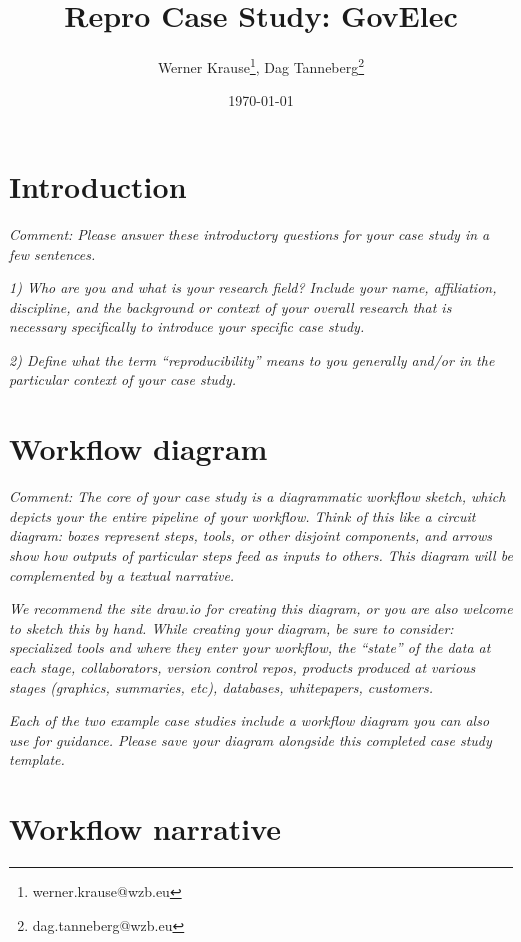 \documentclass[
  11pt
]{article}
\title{Repro Case Study: GovElec}
\author{Werner Krause\thanks{werner.krause@wzb.eu}, Dag Tanneberg\thanks{dag.tanneberg@wzb.eu}}
\date{\today}
\begin{document}
\maketitle

\thispagestyle{empty}

\clearpage
\setcounter{page}{1}
\onehalfspacing

\section{Introduction}
\textit{Comment: Please answer these introductory questions for your case study in a few sentences.}

\noindent
\textit{1) Who are you and what is your research field? Include your name, affiliation, discipline, and the background or context of your overall research that is necessary specifically to introduce your specific case study.}

\noindent
\textit{2) Define what the term ``reproducibility'' means to you generally and/or in the particular context of your case study.}

\section{Workflow diagram}
\textit{Comment: The core of your case study is a diagrammatic workflow sketch, which depicts your the entire pipeline of your workflow. Think of this like a circuit diagram: boxes represent steps, tools, or other disjoint components, and arrows show how outputs of particular steps feed as inputs to others. This diagram will be complemented by a textual narrative.}

\noindent
\textit{We recommend the site draw.io for creating this diagram, or you are also welcome to sketch this by hand. While creating your diagram, be sure to consider: specialized tools and where they enter your workflow, the ``state'' of the data at each stage, collaborators, version control repos, products produced at various stages (graphics, summaries, etc), databases, whitepapers, customers.}

\noindent
\textit{Each of the two example case studies include a workflow diagram you can also use for guidance. Please save your diagram alongside this completed case study template.}



\section{Workflow narrative}
\end{document}
